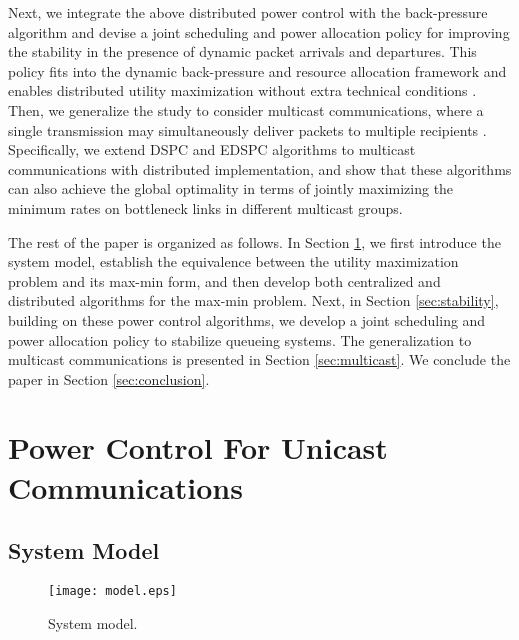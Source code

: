 \documentclass[10pt,journal,letterpaper,compsoc]{IEEEtran}
\begin{document}
Next, we integrate the above distributed power control  with the back-pressure algorithm \cite{ephremides:1992} and devise a joint scheduling and power allocation policy for improving the stability in the presence of dynamic packet arrivals and departures. This policy fits into the dynamic back-pressure and resource allocation framework and enables distributed utility maximization without extra technical conditions \cite{neely:2005} \cite{modiano:2011}.
Then, we generalize the study to  consider multicast communications, where a single transmission may simultaneously deliver packets to multiple recipients \cite{wieselthier:2000}. Specifically, we extend DSPC and EDSPC algorithms to multicast communications with distributed implementation, and show that these algorithms can also achieve the global optimality in terms of jointly maximizing the minimum rates on bottleneck links in different multicast groups.

The rest of the paper is organized as follows. In Section \ref{sec:pc_unicast}, we first introduce the system model, establish the equivalence between the utility maximization problem and its max-min form, and then develop both centralized and distributed algorithms for the max-min problem. Next, in Section \ref{sec:stability}, building on these power control algorithms, we develop a joint scheduling and power allocation policy to stabilize queueing systems. The generalization to multicast communications is presented in Section \ref{sec:multicast}. We conclude the paper in Section \ref{sec:conclusion}.


\section{Power Control For Unicast Communications}\label{sec:pc_unicast}
\subsection{System Model}

\begin{figure}[t]
\begin{center}
\vspace{1.8cm}\hspace{3.0cm} {\texttt{[image: model.eps]}}\hspace{-0.0cm}
\vspace{5.5cm} \caption{System model.}\vspace{0cm}
\label{fig:model}
\end{center}
\end{figure}
\end{document}
